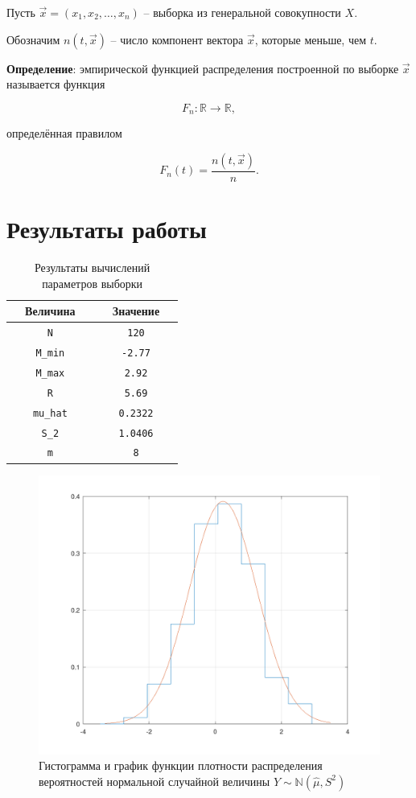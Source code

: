 Пусть $\overrightarrow{x} = (x_1, x_2, \dots, x_n)$ -- выборка из генеральной совокупности $X$.

Обозначим $n(t, \overrightarrow{x})$ -- число компонент вектора $\overrightarrow{x}$, которые меньше, чем $t$.

\textbf{Определение}: эмпирической функцией распределения построенной по выборке $\overrightarrow{x}$ называется функция

\begin{equation}
	F_n: \mathbb{R} \rightarrow \mathbb{R},
\end{equation}

определённая правилом

\begin{equation}
	F_n(t) = \frac{n(t, \overrightarrow{x})}{n}.
\end{equation}

\clearpage

\section{Результаты работы}

\begin{table}
	\centering
	\begin{tabular}{|c|c|}
		\hline
		\textbf{~~Величина~~} & \textbf{~~Значение~~} \\
		\hline
		\texttt{N} & \texttt{120} \\
		\texttt{M\_min} & \texttt{-2.77} \\
		\texttt{M\_max} & \texttt{2.92} \\
		\texttt{R} & \texttt{5.69} \\
		\texttt{mu\_hat} & \texttt{0.2322} \\
		\texttt{S\_2} & \texttt{1.0406} \\
		\texttt{m} & \texttt{8} \\
		\hline
	\end{tabular}
	\caption{Результаты вычислений параметров выборки}
\end{table}

\begin{figure}
	\centering	\includegraphics[width=0.8\linewidth]{img/screenshot002}
	\caption{Гистограмма и график функции плотности распределения вероятностей нормальной случайной величины $Y\sim\mathbb{N}(\hat{\mu}, S^2)$}
	\label{fig:screenshot002}
\end{figure}

